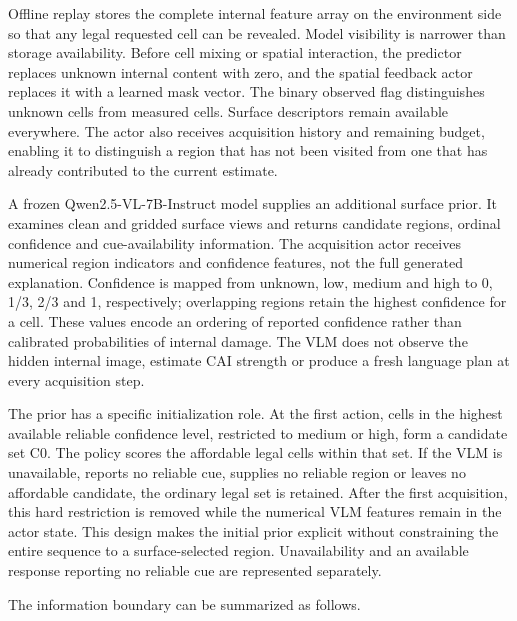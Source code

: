 Offline replay stores the complete internal feature array on the environment side so that any legal requested cell can be revealed. Model visibility is narrower than storage availability. Before cell mixing or spatial interaction, the predictor replaces unknown internal content with zero, and the spatial feedback actor replaces it with a learned mask vector. The binary observed flag distinguishes unknown cells from measured cells. Surface descriptors remain available everywhere. The actor also receives acquisition history and remaining budget, enabling it to distinguish a region that has not been visited from one that has already contributed to the current estimate.

A frozen Qwen2.5-VL-7B-Instruct model \citep{bai2025} supplies an additional surface prior. It examines clean and gridded surface views and returns candidate regions, ordinal confidence and cue-availability information. The acquisition actor receives numerical region indicators and confidence features, not the full generated explanation. Confidence is mapped from unknown, low, medium and high to 0, 1/3, 2/3 and 1, respectively; overlapping regions retain the highest confidence for a cell. These values encode an ordering of reported confidence rather than calibrated probabilities of internal damage. The VLM does not observe the hidden internal image, estimate CAI strength or produce a fresh language plan at every acquisition step.

The prior has a specific initialization role. At the first action, cells in the highest available reliable confidence level, restricted to medium or high, form a candidate set C0. The policy scores the affordable legal cells within that set. If the VLM is unavailable, reports no reliable cue, supplies no reliable region or leaves no affordable candidate, the ordinary legal set is retained. After the first acquisition, this hard restriction is removed while the numerical VLM features remain in the actor state. This design makes the initial prior explicit without constraining the entire sequence to a surface-selected region. Unavailability and an available response reporting no reliable cue are represented separately.

The information boundary can be summarized as follows.

